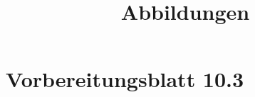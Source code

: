\documentclass[]{uebungsblatt}
\title{Abbildungen}
\begin{document}
    \maketitle
    \makepreamble
    
    \section*{Vorbereitungsblatt 10.3}
    
    
    \newpage
    
    \begin{solutions}
    \end{solutions}
    
    \newpage
    
    \makehints
\end{document}
